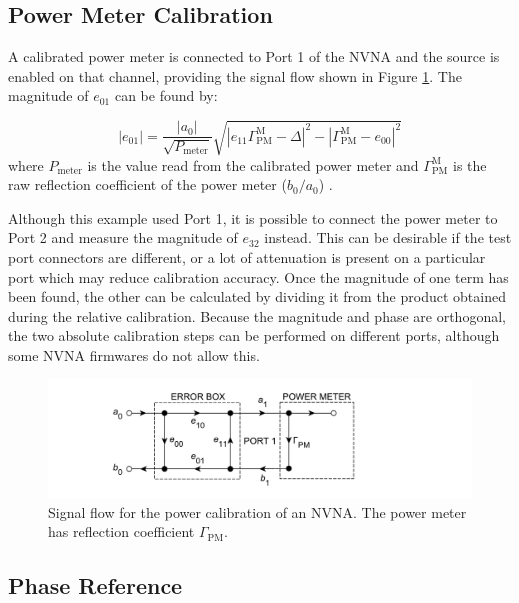 \documentclass[../thesis/thesis.tex]{subfiles}
\begin{document}
\begin{refsection}
\subsection{Power Meter Calibration}

A calibrated power meter is connected to Port 1 of the NVNA and the source is enabled on that channel, providing the signal flow shown in Figure \ref{ch2_fig_powercal}. The magnitude of $e_{01}$ can be found by:

\begin{equation}
	|e_{01}| = \frac{|a_0|}{\sqrt{P_\textrm{meter}}}\sqrt{|e_{11}\Gamma^\textrm{M}_\textrm{PM}-\Delta|^2-|\Gamma^\textrm{M}_\textrm{PM}-e_{00}|^2}
\end{equation}
where $P_\textrm{meter}$ is the value read from the calibrated power meter and $\Gamma^\textrm{M}_\textrm{PM}$ is the raw reflection coefficient of the power meter ($b_0/a_0$) \cite{Lin_2012}.

Although this example used Port 1, it is possible to connect the power meter to Port 2 and measure the magnitude of $e_{32}$ instead. This can be desirable if the test port connectors are different, or a lot of attenuation is present on a particular port which may reduce calibration accuracy. Once the magnitude of one term has been found, the other can be calculated by dividing it from the product obtained during the relative calibration. Because the magnitude and phase are orthogonal, the two absolute calibration steps can be performed on different ports, although some NVNA firmwares do not allow this.

\begin{figure}
	\centering
	\includegraphics[width=\textwidth]{ch2_powercal}
	\caption[The power calibration of an NVNA.]{Signal flow for the power calibration of an NVNA. The power meter has reflection coefficient $\Gamma_\textrm{PM}$.}
	\label{ch2_fig_powercal}
\end{figure}

\subsection{Phase Reference}


\end{refsection}
\end{document}
